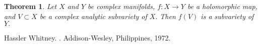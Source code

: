 \documentclass[12pt]{article}
\theoremstyle{theorem}
\newtheorem*{thm}{Theorem}
\theoremstyle{definition}
\theoremstyle{remark}
\begin{document}
\begin{thm}
Let $X$ and $Y$ be complex manifolds, $f \colon X \to Y$ be a  holomorphic map,
and $V \subset X$ be a complex analytic subvariety of $X.$
Then $f(V)$ is a subvariety of $Y.$
\end{thm}



\begin{thebibliography}{9}
Hassler Whitney.
{\em {}}.
Addison-Wesley, Philippines, 1972.
\end{thebibliography}
\end{document}
